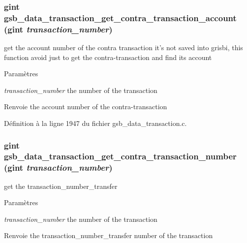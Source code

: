\subsubsection[{gsb\_\-data\_\-transaction\_\-get\_\-contra\_\-transaction\_\-account}]{\setlength{\rightskip}{0pt plus 5cm}gint gsb\_\-data\_\-transaction\_\-get\_\-contra\_\-transaction\_\-account (gint {\em transaction\_\-number})}\label{gsb__data__transaction_8c_a655b6ad03fae3a20ff86adffc95a3ab3}
get the account number of the contra transaction it's not saved into grisbi, this function avoid just to get the contra-\/transaction and find its account


\begin{DoxyParams}{Paramètres}
\item[{\em transaction\_\-number}]the number of the transaction\end{DoxyParams}
\begin{DoxyReturn}{Renvoie}
the account number of the contra-\/transaction 
\end{DoxyReturn}


Définition à la ligne 1947 du fichier gsb\_\-data\_\-transaction.c.

\subsubsection[{gsb\_\-data\_\-transaction\_\-get\_\-contra\_\-transaction\_\-number}]{\setlength{\rightskip}{0pt plus 5cm}gint gsb\_\-data\_\-transaction\_\-get\_\-contra\_\-transaction\_\-number (gint {\em transaction\_\-number})}\label{gsb__data__transaction_8c_a4040925a3db49485b5a2b0a8ea19d2ee}
get the transaction\_\-number\_\-transfer


\begin{DoxyParams}{Paramètres}
\item[{\em transaction\_\-number}]the number of the transaction\end{DoxyParams}
\begin{DoxyReturn}{Renvoie}
the transaction\_\-number\_\-transfer number of the transaction 
\end{DoxyReturn}


